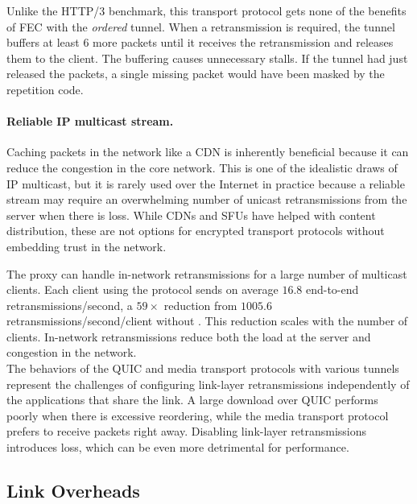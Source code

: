 Unlike the HTTP/3 benchmark, this transport protocol gets none of the benefits
of FEC with the \textit{ordered} tunnel. When a retransmission is required, the
tunnel buffers at least 6 more packets until it receives the
retransmission and releases them to the client. The buffering
causes unnecessary stalls. If the tunnel had just released the
packets, a single missing packet would have been masked by the repetition
code.

\paragraph{Reliable IP multicast stream.}

Caching packets in the network like a CDN is inherently beneficial because it
can reduce the congestion in the core network. This is one of the idealistic
draws of IP multicast, but it is rarely used over the Internet in practice
because a reliable stream may require an overwhelming number of unicast
retransmissions from the server when there is loss. While CDNs and SFUs have
helped with content distribution, these are not options for encrypted transport
protocols without embedding trust in the network.

The \Sys proxy can handle in-network retransmissions for a large number of
multicast clients. Each client using the \Sys protocol sends on average $16.8$
end-to-end retransmissions/second, a $59\!\times$ reduction from $1005.6$
retransmissions/second/client without \Sys. This reduction scales with the
number of clients. In-network retransmissions reduce both the load at the
server and congestion in the network.\\

\noindent
The behaviors of the QUIC and media transport protocols with various tunnels
represent the challenges of configuring link-layer retransmissions
independently of the applications that share the link. A large download
over QUIC performs poorly
when there is excessive reordering, while the media transport protocol prefers
to receive packets right away.
Disabling link-layer retransmissions introduces loss, which can be even more
detrimental for performance.



\subsection{Link Overheads}
\label{sec:evaluation:link-overheads}

